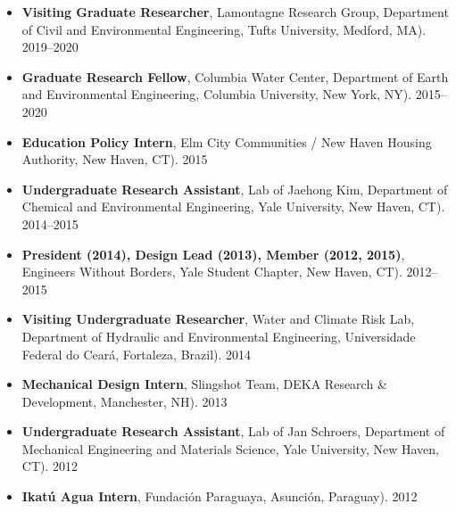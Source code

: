 \documentclass[11pt,article,oneside]{memoir}
\begin{document}
\begin{itemize}[label={}]

  \item \textbf{Visiting Graduate Researcher}, Lamontagne Research Group, Department of Civil and Environmental Engineering, Tufts University, Medford, MA). 2019--2020

  \item \textbf{Graduate Research Fellow}, Columbia Water Center, Department of Earth and Environmental Engineering, Columbia University, New York, NY). 2015--2020

  \item \textbf{Education Policy Intern}, Elm City Communities / New Haven Housing Authority, New Haven, CT). 2015

  \item \textbf{Undergraduate Research Assistant}, Lab of Jaehong Kim, Department of Chemical and Environmental Engineering, Yale University, New Haven, CT). 2014--2015

  \item \textbf{President (2014), Design Lead (2013), Member (2012, 2015)}, Engineers Without Borders, Yale Student Chapter, New Haven, CT). 2012--2015

  \item \textbf{Visiting Undergraduate Researcher}, Water and Climate Risk Lab, Department of Hydraulic and Environmental Engineering, Universidade Federal do Ceará, Fortaleza, Brazil). 2014

  \item \textbf{Mechanical Design Intern}, Slingshot Team, DEKA Research \& Development, Manchester, NH). 2013

  \item \textbf{Undergraduate Research Assistant}, Lab of Jan Schroers, Department of Mechanical Engineering and Materials Science, Yale University, New Haven, CT). 2012

  \item \textbf{Ikatú Agua Intern}, Fundación Paraguaya, Asunción, Paraguay). 2012

\end{itemize}
\end{document}
